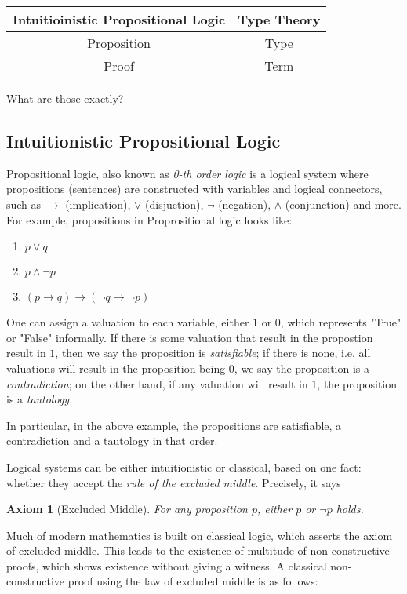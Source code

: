 \begin{tabular}{c|c}
Intuitioinistic Propositional Logic & Type Theory\\
\hline
Proposition & Type\\
Proof & Term
\end{tabular}

What are those exactly?

\subsection{Intuitionistic Propositional Logic}

Propositional logic, also known as \emph{0-th order logic} is a logical system
where propositions (sentences) are constructed with variables and logical
connectors, such as $\to$ (implication), $\vee$ (disjuction), $\neg$ (negation),
$\wedge$ (conjunction) and more. For example, propositions in Proprositional
logic looks like:

\begin{enumerate}
    \item $p\vee q$
    \item $p\wedge \neg p$
    \item $(p\to q)\to (\neg q\to\neg p)$
\end{enumerate}

One can assign a valuation to each variable, either $1$ or $0$, which represents
"True" or "False" informally. If there is some valuation that result in the
propostion result in $1$, then we say the proposition is \emph{satisfiable}; if 
there is none, i.e. all valuations will result in the proposition being $0$, 
we say the proposition is a \emph{contradiction}; on the other hand, if any 
valuation will result in $1$, the proposition is a \emph{tautology}.

In particular, in the above example, the propositions are satisfiable, a
contradiction and a tautology in that order.

Logical systems can be either intuitionistic or classical, based on one fact:
whether they accept the \emph{rule of the excluded middle}. Precisely, it says

\newtheorem{axiom}{Axiom}[section]
\begin{axiom}[Excluded Middle]
    For any proposition $p$, either $p$ or $\neg p$ holds.
\end{axiom}

Much of modern mathematics is built on classical logic, which asserts the axiom
of excluded middle. This leads to the existence of multitude of non-constructive 
proofs, which shows existence without giving a witness. A classical
non-constructive proof using the law of excluded middle is as follows:

